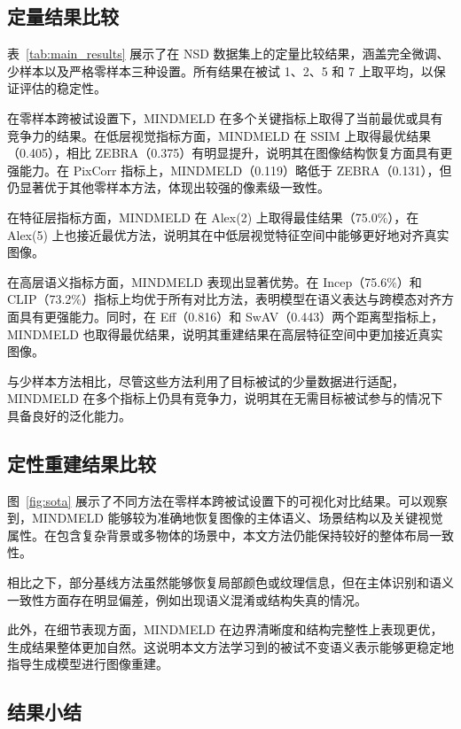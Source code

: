 \subsection{定量结果比较}

表~\ref{tab:main_results} 展示了在 NSD 数据集上的定量比较结果，涵盖完全微调、少样本以及严格零样本三种设置。所有结果在被试 1、2、5 和 7 上取平均，以保证评估的稳定性。

在零样本跨被试设置下，MINDMELD 在多个关键指标上取得了当前最优或具有竞争力的结果。在低层视觉指标方面，MINDMELD 在 SSIM 上取得最优结果（0.405），相比 ZEBRA（0.375）有明显提升，说明其在图像结构恢复方面具有更强能力。在 PixCorr 指标上，MINDMELD（0.119）略低于 ZEBRA（0.131），但仍显著优于其他零样本方法，体现出较强的像素级一致性。

在特征层指标方面，MINDMELD 在 Alex(2) 上取得最佳结果（75.0\%），在 Alex(5) 上也接近最优方法，说明其在中低层视觉特征空间中能够更好地对齐真实图像。

在高层语义指标方面，MINDMELD 表现出显著优势。在 Incep（75.6\%）和 CLIP（73.2\%）指标上均优于所有对比方法，表明模型在语义表达与跨模态对齐方面具有更强能力。同时，在 Eff（0.816）和 SwAV（0.443）两个距离型指标上，MINDMELD 也取得最优结果，说明其重建结果在高层特征空间中更加接近真实图像。

与少样本方法相比，尽管这些方法利用了目标被试的少量数据进行适配，MINDMELD 在多个指标上仍具有竞争力，说明其在无需目标被试参与的情况下具备良好的泛化能力。

\subsection{定性重建结果比较}

图~\ref{fig:sota} 展示了不同方法在零样本跨被试设置下的可视化对比结果。可以观察到，MINDMELD 能够较为准确地恢复图像的主体语义、场景结构以及关键视觉属性。在包含复杂背景或多物体的场景中，本文方法仍能保持较好的整体布局一致性。

相比之下，部分基线方法虽然能够恢复局部颜色或纹理信息，但在主体识别和语义一致性方面存在明显偏差，例如出现语义混淆或结构失真的情况。

此外，在细节表现方面，MINDMELD 在边界清晰度和结构完整性上表现更优，生成结果整体更加自然。这说明本文方法学习到的被试不变语义表示能够更稳定地指导生成模型进行图像重建。

\subsection{结果小结}

